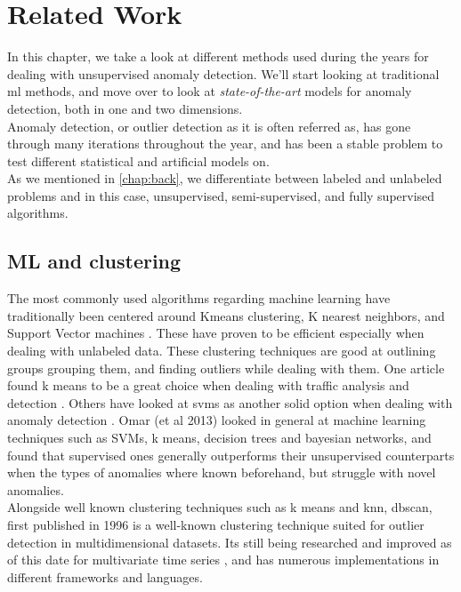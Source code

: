 \chapter{Related Work}
\label{chap:relwork}

In this chapter, we take a look at different methods used during the years for dealing with unsupervised anomaly detection. We'll start looking at traditional \acrlong{ml} methods, and move over to look at \textit{state-of-the-art} models for anomaly detection, both in one and two dimensions. \\


Anomaly detection, or outlier detection as it is often referred as, has gone through many iterations throughout the year, and has been a stable problem to test different statistical and artificial models on. \\ 

As we mentioned in \ref{chap:back}, we differentiate between labeled and unlabeled problems and in this case, unsupervised, semi-supervised, and fully supervised algorithms.

\section{ML and clustering}
The most commonly used algorithms regarding machine learning have traditionally been centered around Kmeans clustering, K nearest neighbors, and  Support Vector machines \cite{10.14778/3538598.3538602, 10.1145/3444690}. These have proven to be efficient especially when dealing with unlabeled data. These clustering techniques are good at outlining groups grouping them, and finding outliers while dealing with them. One article found k means to be a great choice when dealing with traffic analysis and detection \cite{7507933}. Others have looked at svms as another solid option when dealing with anomaly detection \cite{10.1007/978-3-540-28647-9_97}. Omar (et al 2013) \cite{omar2013machine} looked in general at machine learning techniques such as SVMs, k means, decision trees and bayesian networks, and found that supervised ones generally outperforms their unsupervised counterparts when the types of anomalies where known beforehand, but struggle with novel anomalies. \\ 

Alongside well known clustering techniques such as k means and knn, \acrfull{dbscan}, first published in 1996 \cite{10.5555/3001460.3001507} is a well-known clustering technique suited for outlier detection in multidimensional datasets. Its still being researched and improved as of this date for multivariate time series \cite{waltz2024time}, and has numerous implementations in different frameworks and languages. 

